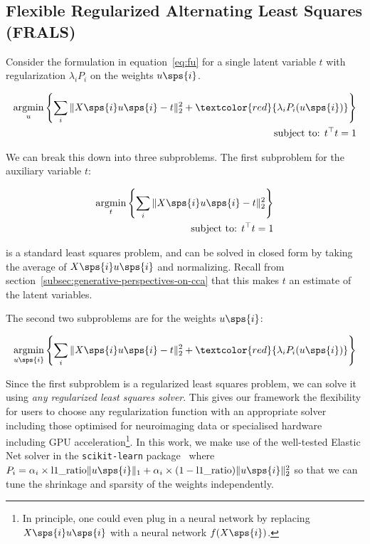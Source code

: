 \subsection{Flexible Regularized Alternating Least Squares (FRALS)}\label{subsec:flexible-regularized-alternating-least
-squares-(frals)}

Consider the formulation in equation~\ref{eq:fu} for a single latent variable \(t\) with regularization $\lambda_i P_i$ on the weights \(u\sps{i}\).

\begin{align}
    \underset{u}{\mathrm{argmin}}\left\{\sum_i \|X\sps{i} u\sps{i} - t\|_2^2 + \textcolor{red}{\lambda_i P_i(u\sps{i})} \right\}\\
    \text{subject to: }t^\top t = 1\\
\end{align}

We can break this down into three subproblems.
The first subproblem for the auxiliary variable \(t\):

\begin{align}
    \underset{t}{\mathrm{argmin}}\left\{\sum_i \|X\sps{i} u\sps{i} - t\|_2^2\right\}\\
    \text{subject to: }t^\top t = 1\\
\end{align}

is a standard least squares problem, and can be solved in closed form by taking the average of $X\sps{i} u\sps{i}$ and normalizing.
Recall from section~\ref{subsec:generative-perspectives-on-cca} that this makes $t$ an estimate of the latent variables.

The second two subproblems are for the weights \(u\sps{i}\):

\begin{align}
    \underset{u\sps{i}}{\mathrm{argmin}}\left\{\sum_i \|X\sps{i} u\sps{i} - t\|_2^2 + \textcolor{red}{\lambda_i P_i(u\sps{i})} \right\}\\
\end{align}

Since the first subproblem is a regularized least squares problem, we can solve it using \textit{any regularized least squares solver}.
This gives our framework the flexibility for users to choose any regularization function with an appropriate solver including those optimised for neuroimaging data\citep{Nilearn_contributors_Nilearn} or specialised hardware including GPU acceleration\footnote{In principle, one could even plug in a neural network by replacing $X\sps{i} u\sps{i}$ with a neural network $f(X\sps{i})$.}.
In this work, we make use of the well-tested Elastic Net solver in the \texttt{scikit-learn} package~\citep{pedregosa2011scikit} where $P_i=\alpha_i \times \text{l1\_ratio} \|u\sps{i}\|_1 + \alpha_i \times (1-\text{l1\_ratio}) \|u\sps{i}\|^2_2$ so that we can tune the shrinkage and sparsity of the weights independently.

